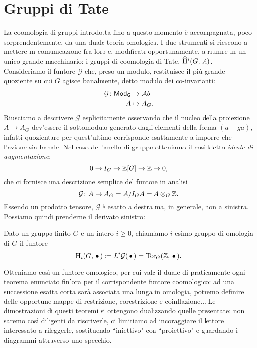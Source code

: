 \section{Gruppi di Tate}
La coomologia di gruppi introdotta fino a questo momento è accompagnata, poco sorprendentemente, da una duale teoria omologica. I due strumenti si riescono a mettere in comunicazione fra loro e, modificati opportunamente, a riunire in un unico grande macchinario: i gruppi di coomologia di Tate, $ \operatorname{\widehat{H}^\mathnormal{i}}(G, \, A) $. \\

Consideriamo il funtore $ \mathcal{G} $ che, preso un modulo, restituisce il più grande quoziente su cui $ G $ agisce banalmente, detto modulo dei co-invarianti:
\begin{align*} 
\mathcal{G} \colon \mathsf{Mod}_\mathsf{G} &\to \mathcal{A}b \\
A &\mapsto A_G.
\end{align*}
Riusciamo a descrivere $ \mathcal{G} $ esplicitamente osservando che il nucleo della proiezione $ A \to A_G $ dev'essere il sottomodulo generato dagli elementi della forma $ (a - ga) $, infatti quozientare per quest'ultimo corrisponde esattamente a imporre che l'azione sia banale. Nel caso dell'anello di gruppo otteniamo il cosiddetto \emph{ideale di augmentazione}:
\[ 0 \to I_G \to \mathbb{Z}[G] \to \mathbb{Z} \to 0, \]
che ci fornisce una descrizione semplice del funtore in analisi
\[ \mathcal{G} \colon A \to A_G = A/I_GA = A \otimes_G \mathbb{Z}. \]
Essendo un prodotto tensore, $ \mathcal{G} $ è esatto a destra ma, in generale, non a sinistra. Possiamo quindi prenderne il derivato sinistro:

\begin{definition}
	Dato un gruppo finito $ G $ e un intero $ i \geq 0 $, chiamiamo $ i $-esimo gruppo di omologia di $ G $ il funtore
	\[ \operatorname{H}_i(G, \, \bullet \,) := L^i\mathcal{G}(\, \bullet \,) = \operatorname{Tor}_G(\mathbb{Z}, \, \bullet \, ). \]
\end{definition}

Otteniamo così un funtore omologico, per cui vale il duale di praticamente ogni teorema enunciato fin'ora per il corrispondente funtore coomologico: ad una successione esatta corta sarà associata una lunga in omologia, potremo definire delle opportune mappe di restrizione, corestrizione e coinflazione... Le dimostrazioni di questi teoremi si ottengono dualizzando quelle presentate: non saremo così diligenti da riscriverle, ci limitiamo ad incoraggiare il lettore interessato a rileggerle, sostituendo \textquotedblleft iniettivo" con \textquotedblleft proiettivo" e guardando i diagrammi attraverso uno specchio. \\

